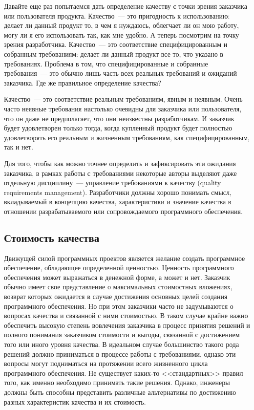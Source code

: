 \documentclass{../../text-style}
\begin{document}
Давайте еще раз попытаемся дать определение качеству с точки зрения заказчика или пользователя продукта. Качество~--- это пригодность к использованию: делает ли данный продукт то, в чем я нуждаюсь, облегчает ли он мою работу, могу ли я его использовать так, как мне удобно. А теперь посмотрим на точку зрения разработчика. Качество~--- это соответствие специфицированным и собранным требованиям: делает ли данный продукт все то, что указано в требованиях. Проблема в том, что специфицированные и собранные требования~--- это обычно лишь часть всех реальных требований и ожиданий заказчика. Где же правильное определение качества?

Качество~--- это соответствие реальным требованиям, явным и неявным. Очень часто неявные требования настолько очевидны для заказчика или пользователя, что он даже не предполагает, что они неизвестны разработчикам. И заказчик будет удовлетворен только тогда, когда купленный продукт будет полностью удовлетворять его реальным и жизненным требованиям, как специфицированным, так и нет.

Для того, чтобы как можно точнее определить и зафиксировать эти ожидания заказчика, в рамках работы с требованиями некоторые авторы выделяют даже отдельную дисциплину~--- управление требованиями к качеству (quality requirements management). Разработчики должны хорошо понимать смысл, вкладываемый в концепцию качества, характеристики и значение качества в отношении разрабатываемого или сопровождаемого программного обеспечения.

\subsection{Стоимость качества}


Движущей силой программных проектов является желание создать программное обеспечение, обладающее определенной ценностью. Ценность программного обеспечения может выражаться в денежной форме, а может и нет. Заказчик обычно имеет свое представление о максимальных стоимостных вложениях, возврат которых ожидается в случае достижения основных целей создания программного обеспечения. Но при этом заказчики часто не задумываются о вопросах качества и связанной с ними стоимостью. В таком случае крайне важно обеспечить высокую степень вовлечения заказчика в процесс принятия решений и полного понимания заказчиком стоимости и выгоды, связанной с достижением того или иного уровня качества. В идеальном случае большинство такого рода решений должно приниматься в процессе работы с требованиями, однако эти вопросы могут подниматься на протяжении всего жизненного цикла программного обеспечения. Не существует каких-то <<стандартных>> правил того, как именно необходимо принимать такие решения. Однако, инженеры должны быть способны представить различные альтернативы по достижению разных характеристик качества и их стоимость.
\end{document}
